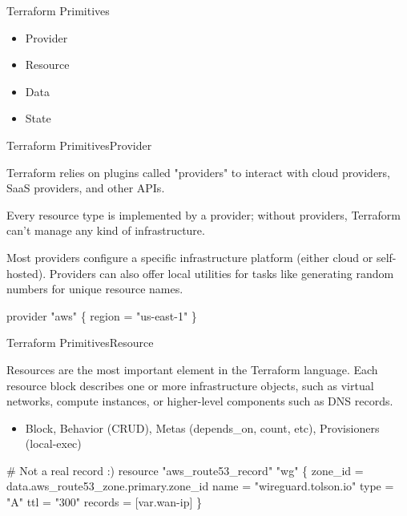 \documentclass{beamer}
\begin{document}

\begin{frame}{Terraform Primitives}

\begin{itemize}
    \item Provider
    \item Resource
    \item Data
    \item State
\end{itemize}

\end{frame}


\begin{frame}[fragile]{Terraform Primitives}{Provider}

Terraform relies on plugins called "providers" to interact with cloud providers, SaaS providers, and other APIs.
\vspace{0.2cm}

Every resource type is implemented by a provider; without providers, Terraform can't manage any kind of infrastructure.
\vspace{0.2cm}

Most providers configure a specific infrastructure platform (either cloud or self-hosted). Providers can also offer local utilities for tasks like generating random numbers for unique resource names.

\begin{semiverbatim}
provider "aws" \{
  region = "us-east-1"
\}
\end{semiverbatim}

\end{frame}


\begin{frame}[fragile]{Terraform Primitives}{Resource}

Resources are the most important element in the Terraform language. Each resource block describes one or more infrastructure objects, such as virtual networks, compute instances, or higher-level components such as DNS records.

\begin{itemize}
    \item Block, Behavior (CRUD), Metas (depends\_on, count, etc), Provisioners (local-exec)
\end{itemize}

\begin{semiverbatim}
# Not a real record :)
resource "aws_route53_record" "wg" \{
  zone_id = data.aws_route53_zone.primary.zone_id
  name    = "wireguard.tolson.io"
  type    = "A"
  ttl     = "300"
  records = [var.wan-ip]
\}
\end{semiverbatim}

\end{frame}
\end{document}
